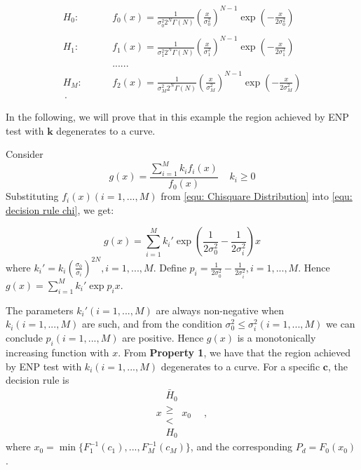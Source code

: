 \documentclass[12pt,journal,a4paper,twoside,onecolumn]{IEEEtran}
\begin{document}
\begin{spacing}{2.5}
\def \CHISQU[#1]{\frac{1}{#1 2^N\Gamma(N)}\left(\frac{x}{#1}\right)^{N-1}\exp\left(-\frac{x}{2#1}\right)\\}
\begin{equation}
  \label{equ: Chisquare Distribution}
  \begin{split}
    H_0:\;\;\;\;\;\;\;\;&f_0(x) = \CHISQU[\sigma_0^2]\\
    H_1:\;\;\;\;\;\;\;\;&f_1(x) = \CHISQU[\sigma_1^2]\\
    &......\\
    H_M:\;\;\;\;\;\;\;\;&f_2(x) = \CHISQU[\sigma_M^2]\,.
  \end{split}
\end{equation}

In the following, we will prove that in this example the region achieved by ENP test with $\mathbf{k}$ degenerates to a curve.

Consider
\begin{equation}
\label{equ: decision rule chi}
  g(x) = \frac{\sum_{i=1}^{M}k_if_i(x)}{f_0(x)} \;\;\;\;k_i \geq 0
\end{equation}
Substituting $f_i(x) (i=1, ..., M)$ from \eqref{equ: Chisquare Distribution} into \eqref{equ: decision rule chi}, we get:

\begin{equation}
  \label{equ: decision rule chi 1}
g(x) = \sum_{i=1}^{M}k_i'\exp{(\frac{1}{2\sigma_0^2} - \frac{1}{2\sigma_i^2})x} 
\end{equation}
where $k_i' = k_i(\frac{\sigma_0}{\sigma_i})^{2N}, i= 1, ..., M$. Define $p_i = \frac{1}{2\sigma_0^2} - \frac{1}{2\sigma_i^2}, i=1, ..., M$. Hence $g(x) =  \sum_{i=1}^{M}k_i'\exp{p_ix}$.

The parameters $k_i' (i=1, ..., M)$ are always non-negative when $k_i (i=1, ..., M)$ are such, and from 
 the condition $\sigma_0^2 \leq \sigma_i^2 (i=1, ..., M)$ we can conclude $p_i (i=1, ..., M)$ are positive. Hence $g(x)$ is a monotonically increasing function with $x$. From \textbf{Property 1}, we have that the region achieved by ENP test with $k_i (i = 1, ..., M)$ degenerates to a curve. For a specific $\mathbf{c}$, the decision rule is
\begin{equation}
  \label{equ: decision rule chi 2}
  x \substack{\bar{H}_0 \\ \geq \\ < \\ H_0} x_0\;\;\;\;\,,
\end{equation}
where $x_0 = \min\{F_1^{-1}(c_1), ..., F_M^{-1}(c_M)\}$,
and the corresponding $P_d = F_0(x_0)$. 


\end{spacing}
\end{document}
